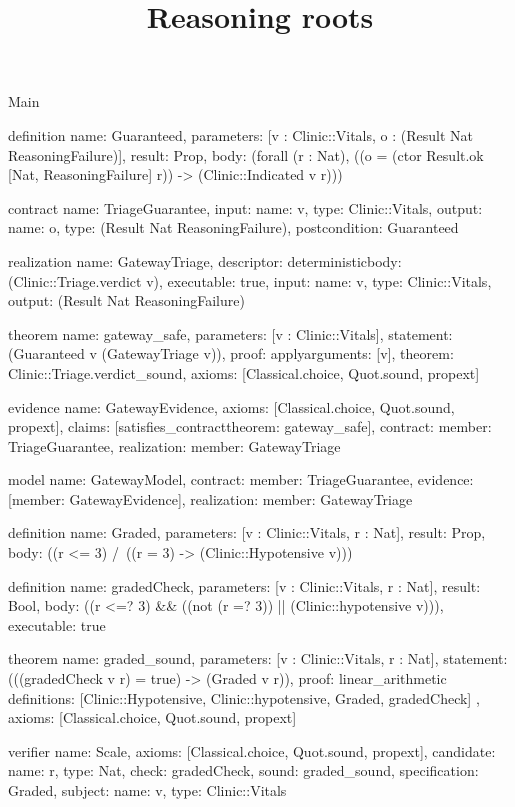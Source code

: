 \begin{lexlean}{Main}
\title{Reasoning roots}
\begin{semanticmodule}
definition{
  name: Guaranteed,
  parameters: [v : Clinic::Vitals, o : (Result Nat ReasoningFailure)],
  result: Prop,
  body: (forall (r : Nat), ((o = (ctor Result.ok [Nat, ReasoningFailure] r)) -> (Clinic::Indicated v r)))
}

contract{
  name: TriageGuarantee,
  input: {name: v, type: Clinic::Vitals},
  output: {name: o, type: (Result Nat ReasoningFailure)},
  postcondition: Guaranteed
}

realization{
  name: GatewayTriage,
  descriptor: deterministic{body: (Clinic::Triage.verdict v)},
  executable: true,
  input: {name: v, type: Clinic::Vitals},
  output: (Result Nat ReasoningFailure)
}

theorem{
  name: gateway_safe,
  parameters: [v : Clinic::Vitals],
  statement: (Guaranteed v (GatewayTriage v)),
  proof: apply{arguments: [v], theorem: Clinic::Triage.verdict_sound},
  axioms: [Classical.choice, Quot.sound, propext]
}

evidence{
  name: GatewayEvidence,
  axioms: [Classical.choice, Quot.sound, propext],
  claims: [satisfies_contract{theorem: gateway_safe}],
  contract: {member: TriageGuarantee},
  realization: {member: GatewayTriage}
}

model{
  name: GatewayModel,
  contract: {member: TriageGuarantee},
  evidence: [{member: GatewayEvidence}],
  realization: {member: GatewayTriage}
}

definition{
  name: Graded,
  parameters: [v : Clinic::Vitals, r : Nat],
  result: Prop,
  body: ((r <= 3) /\ ((r = 3) -> (Clinic::Hypotensive v)))
}

definition{
  name: gradedCheck,
  parameters: [v : Clinic::Vitals, r : Nat],
  result: Bool,
  body: ((r <=? 3) && ((not (r =? 3)) || (Clinic::hypotensive v))),
  executable: true
}

theorem{
  name: graded_sound,
  parameters: [v : Clinic::Vitals, r : Nat],
  statement: (((gradedCheck v r) = true) -> (Graded v r)),
  proof: linear_arithmetic{
    definitions: [Clinic::Hypotensive, Clinic::hypotensive, Graded, gradedCheck]
  },
  axioms: [Classical.choice, Quot.sound, propext]
}

verifier{
  name: Scale,
  axioms: [Classical.choice, Quot.sound, propext],
  candidate: {name: r, type: Nat},
  check: gradedCheck,
  sound: graded_sound,
  specification: Graded,
  subject: {name: v, type: Clinic::Vitals}
}


\end{semanticmodule}
\end{lexlean}
